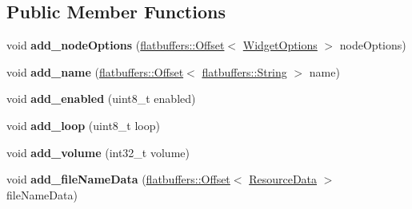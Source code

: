\subsection*{Public Member Functions}
\begin{DoxyCompactItemize}
\item 
\mbox{\label{structflatbuffers_1_1ComAudioOptionsBuilder_a008124689019ca0ffb92b791858186b7}} 
void {\bfseries add\+\_\+node\+Options} (\hyperlink{structflatbuffers_1_1Offset}{flatbuffers\+::\+Offset}$<$ \hyperlink{structflatbuffers_1_1WidgetOptions}{Widget\+Options} $>$ node\+Options)
\item 
\mbox{\label{structflatbuffers_1_1ComAudioOptionsBuilder_a8a1d573b60245e73feb3cb55e6b591ba}} 
void {\bfseries add\+\_\+name} (\hyperlink{structflatbuffers_1_1Offset}{flatbuffers\+::\+Offset}$<$ \hyperlink{structflatbuffers_1_1String}{flatbuffers\+::\+String} $>$ name)
\item 
\mbox{\label{structflatbuffers_1_1ComAudioOptionsBuilder_a495bad11bac9088c1db6f9c3ac6cc2ee}} 
void {\bfseries add\+\_\+enabled} (uint8\+\_\+t enabled)
\item 
\mbox{\label{structflatbuffers_1_1ComAudioOptionsBuilder_ac841fbe8818c386fecbaa680c39bd4e3}} 
void {\bfseries add\+\_\+loop} (uint8\+\_\+t loop)
\item 
\mbox{\label{structflatbuffers_1_1ComAudioOptionsBuilder_ae06626f8ad678552da4cd27bc0134e3a}} 
void {\bfseries add\+\_\+volume} (int32\+\_\+t volume)
\item 
\mbox{\label{structflatbuffers_1_1ComAudioOptionsBuilder_a74e4b03d9397d027c8c0a392cc6ac765}} 
void {\bfseries add\+\_\+file\+Name\+Data} (\hyperlink{structflatbuffers_1_1Offset}{flatbuffers\+::\+Offset}$<$ \hyperlink{structflatbuffers_1_1ResourceData}{Resource\+Data} $>$ file\+Name\+Data)
\item 
\mbox{\label{structflatbuffers_1_1ComAudioOptionsBuilder_a91e8d1ea36c4dd8ec776f73af7bda804}} 

\end{DoxyCompactItemize}
